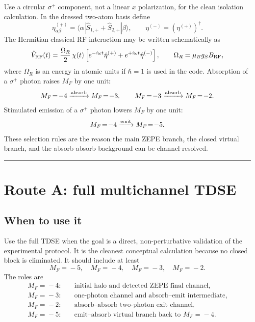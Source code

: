 \documentclass[11pt,a4paper]{article}
\newcommand{\MF}[1]{M_F\!=\!#1}
\newcommand{\matel}[3]{\langle #1 | #2 | #3 \rangle}
\begin{document}
Use a circular $\sigma^+$ component, not a linear $x$ polarization, for the
clean isolation calculation.  In the dressed two-atom basis define
\begin{equation}
\eta^{(+)}_{\alpha\beta}=\matel{\alpha}{\hat S_{1,+}+\hat S_{2,+}}{\beta},
\qquad
\eta^{(-)}=(\eta^{(+)})^\dagger.
\end{equation}
The Hermitian classical RF interaction may be written schematically as
\begin{equation}
\hat V_{\rm RF}(t)=\frac{\Omega_R}{2}\,\chi(t)
\left[e^{-i\omega t}\hat\eta^{(+)}+e^{+i\omega t}\hat\eta^{(-)}\right],
\qquad \Omega_R=\mu_B g_S B_{\rm RF},
\end{equation}
where $\Omega_R$ is an energy in atomic units if $\hbar=1$ is used in the code.
Absorption of a $\sigma^+$ photon raises $M_F$ by one unit:
\begin{equation}
\MF{-4}\xrightarrow{\rm absorb}\MF{-3},
\qquad
\MF{-3}\xrightarrow{\rm absorb}\MF{-2}.
\end{equation}
Stimulated emission of a $\sigma^+$ photon lowers $M_F$ by one unit:
\begin{equation}
\MF{-4}\xrightarrow{\rm emit}\MF{-5}.
\end{equation}
These selection rules are the reason the main ZEPE branch, the closed virtual
branch, and the absorb-absorb background can be channel-resolved.

\medskip\hrule\medskip

\section{Route A: full multichannel TDSE}

\subsection{When to use it}

Use the full TDSE when the goal is a direct, non-perturbative validation of the
experimental protocol.  It is the cleanest conceptual calculation because no
closed block is eliminated.  It should include at least
\begin{equation}
\boxed{\MF{-5},\quad\MF{-4},\quad\MF{-3},\quad\MF{-2}.}
\end{equation}
The roles are
\begin{align}
\MF{-4}:&\quad \text{initial halo and detected ZEPE final channel},\\
\MF{-3}:&\quad \text{one-photon channel and absorb--emit intermediate},\\
\MF{-2}:&\quad \text{absorb--absorb two-photon exit channel},\\
\MF{-5}:&\quad \text{emit--absorb virtual branch back to }\MF{-4}.
\end{align}
\end{document}
